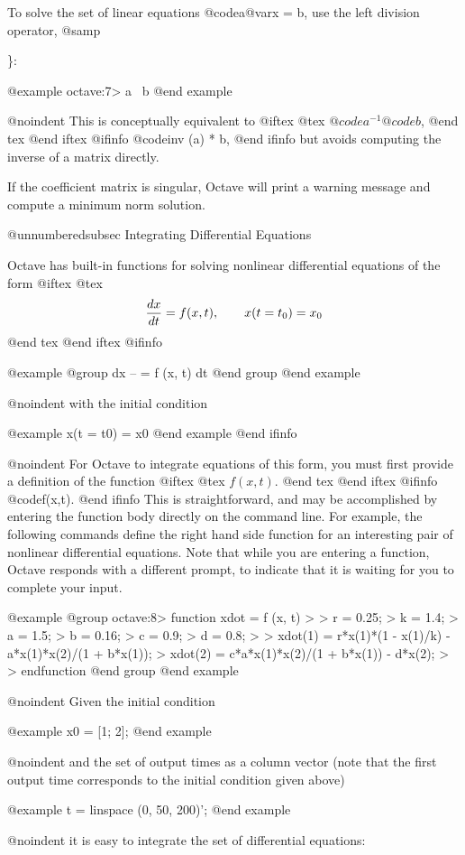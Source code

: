 To solve the set of linear equations @code{a@var{x} = b},
use the left division operator, @samp{\}:

@example
octave:7> a \ b
@end example

@noindent
This is conceptually equivalent to
@iftex
@tex
$@code{a}^{-1}@code{b}$,
@end tex
@end iftex
@ifinfo
@code{inv (a) * b},
@end ifinfo
but avoids computing the inverse of a matrix directly.

If the coefficient matrix is singular, Octave will print a warning
message and compute a minimum norm solution.

@unnumberedsubsec Integrating Differential Equations

Octave has built-in functions for solving nonlinear differential
equations of the form
@iftex
@tex
$$
 {dx \over dt} = f(x,t), \qquad x(t=t_0) = x_0
$$
@end tex
@end iftex
@ifinfo

@example
@group
dx
-- = f (x, t)
dt
@end group
@end example

@noindent
with the initial condition

@example
x(t = t0) = x0
@end example
@end ifinfo

@noindent
For Octave to integrate equations of this form, you must first provide a
definition of the function
@iftex
@tex
$f (x, t)$.
@end tex
@end iftex
@ifinfo
@code{f(x,t)}.
@end ifinfo
This is straightforward, and may be accomplished by entering the
function body directly on the command line.  For example, the following
commands define the right hand side function for an interesting pair of
nonlinear differential equations.  Note that while you are entering a
function, Octave responds with a different prompt, to indicate that it
is waiting for you to complete your input.

@example
@group
octave:8> function xdot = f (x, t) 
>
>  r = 0.25;
>  k = 1.4;
>  a = 1.5;
>  b = 0.16;
>  c = 0.9;
>  d = 0.8;
>
>  xdot(1) = r*x(1)*(1 - x(1)/k) - a*x(1)*x(2)/(1 + b*x(1));
>  xdot(2) = c*a*x(1)*x(2)/(1 + b*x(1)) - d*x(2);
>
> endfunction
@end group
@end example

@noindent
Given the initial condition

@example
x0 = [1; 2];
@end example

@noindent
and the set of output times as a column vector (note that the first
output time corresponds to the initial condition given above)

@example
t = linspace (0, 50, 200)';
@end example

@noindent
it is easy to integrate the set of differential equations:

}
